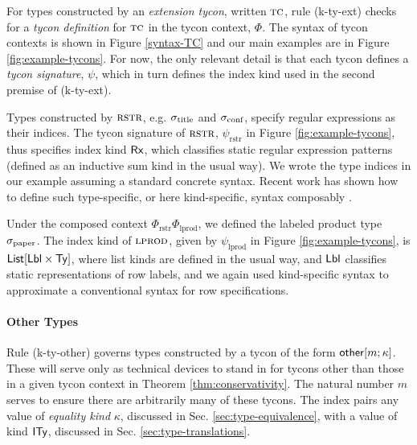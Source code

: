 For types constructed by an \emph{extension tycon}, written $\textsc{tc}$, rule (k-ty-ext) checks for a \emph{tycon definition} for $\textsc{tc}$ in the tycon context, $\Phi$. The syntax of tycon contexts is shown in Figure \ref{syntax-TC} and our main examples are in Figure \ref{fig:example-tycons}. For now, the only relevant detail is that each tycon defines a \emph{tycon signature}, $\psi$, which in turn defines the index kind used in the second premise of (k-ty-ext).

Types constructed by $\textsc{rstr}$, e.g. $\sigma_\text{title}$ and $\sigma_\text{conf}$, specify regular expressions as their indices.  The tycon signature of $\textsc{rstr}$, $\psi_\text{rstr}$ in Figure \ref{fig:example-tycons}, thus specifies index kind ${\sf Rx}$, which classifies static regular expression patterns (defined as an inductive sum kind in the usual way). We wrote the type indices in our example assuming a standard concrete syntax. Recent work has shown how to define such type-specific, or here kind-specific, syntax composably \cite{TSLs}. %

Under the composed context $\Phi_\text{rstr}\Phi_\text{lprod}$, we defined the labeled product type $\sigma_\text{paper}$. The index kind of $\textsc{lprod}$, given by $\psi_\text{lprod}$ in Figure \ref{fig:example-tycons}, is ${\sf List}[{\sf Lbl} \times {\sf Ty}]$, where list kinds are defined in the usual way, and ${\sf Lbl}$ classifies static representations of row labels, and  
we again used kind-specific syntax to approximate a conventional syntax for row specifications. 

\paragraph{Other Types}
Rule (k-ty-other) governs types constructed by a tycon of the form ${\sf other}[m; \kappa]$. These will serve only as technical devices to stand in for tycons other than those in a given tycon context in Theorem \ref{thm:conservativity}. The natural number $m$ serves to ensure there are arbitrarily many of these tycons. The index pairs any value of \emph{equality kind} $\kappa$, discussed in Sec. \ref{sec:type-equivalence}, with a value of kind ${\sf ITy}$, discussed in Sec. \ref{sec:type-translations}.%








